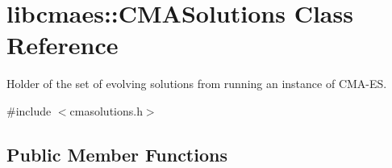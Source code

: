\hypertarget{classlibcmaes_1_1CMASolutions}{\section{libcmaes\+:\+:C\+M\+A\+Solutions Class Reference}
\label{classlibcmaes_1_1CMASolutions}
}


Holder of the set of evolving solutions from running an instance of C\+M\+A-\/\+E\+S.  




{\ttfamily \#include $<$cmasolutions.\+h$>$}

\subsection*{Public Member Functions}
